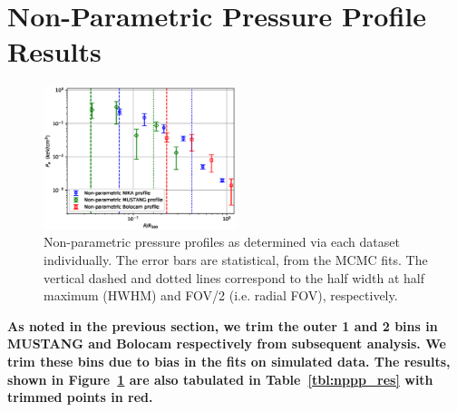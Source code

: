 \documentclass[twocolumn,traditabstract]{aa}
\begin{document}

\section{Non-Parametric Pressure Profile Results}
\label{sec:np_res}

\begin{figure}[!h]
  \centering
  \includegraphics[width=0.5\textwidth]{NIKA_ml_deproj_figs/Real_Joint_gNFW_Power_Real_11011111_2500S_500B_100W_non_parametric_pressure_p16cosmo.eps}
  \caption{Non-parametric pressure profiles as determined via each dataset individually. The error bars are statistical,
    from the MCMC fits. The vertical dashed and dotted lines correspond to the half width at half maximum (HWHM) and
    FOV/2 (i.e. radial FOV), respectively.}
  \label{fig:nppps}
\end{figure}

\textbf{As noted in the previous section, we trim the outer 1 and 2 bins in MUSTANG and Bolocam respectively from subsequent analysis.
We trim these bins due to bias in the fits on simulated data. The results, shown in Figure~\ref{fig:nppps} are also tabulated
in Table~\ref{tbl:nppp_res} with trimmed points in red.}
\end{document}
